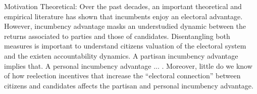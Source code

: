 \documentclass[12pt]{amsart}
\numberwithin{equation}{section}
\theoremstyle{definition}
\theoremstyle{definition}
\theoremstyle{definition}
\begin{document}

Motivation
Theoretical:
Over the past decades, an important theoretical and empirical literature has shown that incumbents enjoy an electoral advantage. However, incumbency advantage masks an understudied dynamic between the returns associated to parties and those of candidates. Disentangling both measures is important to understand citizens valuation of the electoral system and the existen accountability dynamics. A partisan incumbency advantage implies that. A personal incumbency advantage ... . Moreover, little do we know of how reelection incentives that increase the ``electoral connection'' \citep{mayhew_1974} between citizens and candidates affects the partisan and personal incumbency advantage.  
\end{document}
